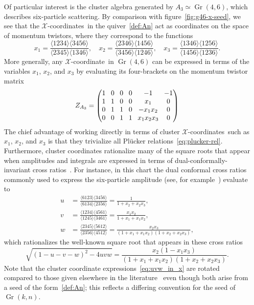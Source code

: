 \documentclass[11pt]{article}
\DeclareMathOperator{\Gr}{Gr}
\def\ket#1{\langle #1 \rangle}
\def\xcoord{$\mathcal{X}$-coordinate}
\def\xcoords{$\mathcal{X}$-coordinates}
\begin{document}
Of particular interest is the cluster algebra generated by $A_3 \simeq \Gr(4,6)$, which describes six-particle scattering. By comparison with figure~\ref{fig:g46-x-seed}, we see that the \xcoords\ in the quiver~\eqref{def:An} act as coordinates on the space of momentum twistors, where they correspond to the functions
\begin{equation}\label{eq:a3-seed-def}
x_1 = \frac{\ket{1234}\ket{3456}}{\ket{2345}\ket{1346}}, \quad x_2 = \frac{\ket{2346}\ket{1456}}{\ket{3456}\ket{1246}}, \quad x_3 = \frac{\ket{1346}\ket{1256}}{\ket{1456}\ket{1236}}.
\end{equation}
More generally, any \xcoord\ in $\Gr(4,6)$ can be expressed in terms of the variables $x_1$, $x_2$, and $x_3$ by evaluating its four-brackets on the momentum twistor matrix
\begin{equation} \label{eq:a3_momentum_twistor_matrix}
Z_{A_3} = 
\begingroup
\setlength\arraycolsep{4pt}
\begin{pmatrix} 
1 & 0 & 0 & 0 & -1 & -1 \\
1 & 1 & 0 & 0 & x_1 & 0 \\
0 & 1 & 1 & 0 & -x_1 x_2 & 0 \\
0 & 0 & 1 & 1 & x_1 x_2 x_3 & 0
\end{pmatrix}
\endgroup 
\end{equation}
The chief advantage of working directly in terms of cluster \xcoords\ such as $x_1$, $x_2$, and $x_3$ is that they trivialize all Pl\"ucker relations~\eqref{eq:plucker-rel}. Furthermore, cluster coordinates rationalize many of the square roots that appear when amplitudes and integrals are expressed in terms of dual-conformally-invariant cross ratios~\cite{Bourjaily:2018aeq}. For instance, in this chart the dual conformal cross ratios commonly used to express the six-particle amplitude (see, for example~\cite{Goncharov:2010jf,Dixon:2011pw,Dixon:2013eka}) evaluate to
\begin{align} \label{eq:uvw_in_x}
u &= \frac{\ket{6123}\ket{3456}}{\ket{6134}\ket{2356}} = \frac{1}{1+x_2+x_2 x_3}, \\ 
v &= \frac{\ket{1234} \ket{4561}}{\ket{1245}\ket{3461}} =\frac{x_1 x_2}{1+x_1+x_1 x_2}, \\ 
w &= \frac{\ket{2345} \ket{5612}}{\ket{2356}\ket{4512}} =\frac{x_2 x_3}{(1+x_1+x_1 x_2)(1+x_2+x_2 x_3)},
\end{align}
which rationalizes the well-known square root that appears in these cross ratios 
\begin{equation}
\sqrt{(1 - u - v - w)^2 - 4 u v w} = \frac{x_2 \left(1-x_1 x_3\right)}{\left(1+x_1+x_1
   x_2\right) \left(1+x_2+x_2 x_3\right)} .
\end{equation}
Note that the cluster coordinate expressions~\eqref{eq:uvw_in_x} are rotated compared to those given elsewhere in the literature~\cite{Golden:2013xva,Parker:2015cia} even though both arise from a seed of the form~\eqref{def:An}; this reflects a differing convention for the seed of $\Gr(k,n)$.
\end{document}
